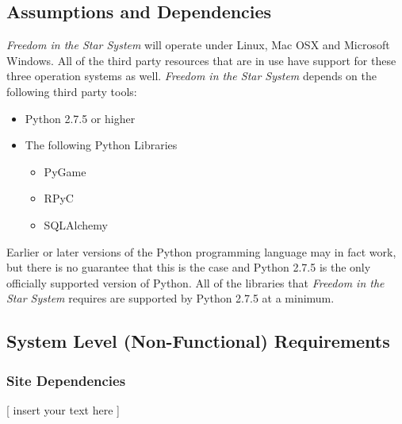 \documentclass[twoside,letterpaper]{article}
\begin{document}
\subsection{Assumptions and Dependencies}
\textit{Freedom in the Star System} will operate under Linux, Mac OSX and Microsoft Windows.  All of the third party resources that are in use have support for these three operation systems as well.  \textit{Freedom in the Star System} depends on the following third party tools:
	\begin{itemize}
		\item Python 2.7.5 or higher
		\item The following Python Libraries
		\begin{itemize}
			\item PyGame
			\item RPyC
			\item SQLAlchemy
		\end{itemize}
	\end{itemize}

Earlier or later versions of the Python programming language may in fact work, but there is no guarantee that this is the case and Python 2.7.5 is the only officially supported version of Python.  All of the libraries that \textit{Freedom in the Star System} requires are supported by Python 2.7.5 at a minimum.

\subsection{System Level (Non-Functional) Requirements}

\subsubsection{Site Dependencies}
[ insert your text here ]
\end{document}
